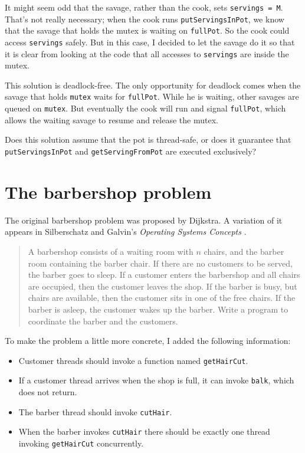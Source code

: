 \documentclass{book}
\newcommand{\clearemptydoublepage}{\newpage\cleardoublepage}
\begin{document}
It might seem odd that the savage, rather than the cook, sets
{\tt servings = M}.  That's not really necessary; when the cook
runs {\tt putServingsInPot}, we know that the savage that holds
the mutex is waiting on {\tt fullPot}.  So the cook could
access {\tt servings} safely.  But in this case, I decided to
let the savage do it so that it is clear from looking at the
code that all accesses to {\tt servings} are inside the mutex.

This solution is deadlock-free.  The only opportunity for
deadlock comes when the savage that holds {\tt mutex} waits
for {\tt fullPot}.  While he is waiting, other savages are
queued on {\tt mutex}.  But eventually the cook will run and
signal {\tt fullPot}, which allows the waiting savage
to resume and release the mutex.

Does this solution assume that the pot is thread-safe, or does it
guarantee that {\tt putServingsInPot} and {\tt getServingFromPot}
are executed exclusively?


\clearemptydoublepage
\section{The barbershop problem}

The original barbershop problem was proposed by
Dijkstra.  A variation of it appears in 
Silberschatz and Galvin's {\em Operating Systems Concepts}
\cite{silberschatz}.

\begin {quotation}
A barbershop consists of a waiting room with $n$ chairs, and the
barber room containing the barber chair.  If there are no customers to
be served, the barber goes to sleep.  If a customer enters the
barbershop and all chairs are occupied, then the customer leaves the
shop.  If the barber is busy, but chairs are available, then the
customer sits in one of the free chairs.  If the barber is asleep, the
customer wakes up the barber.  Write a program to coordinate the
barber and the customers.
\end{quotation}

To make the problem a little more concrete, I added the
following information:

\begin{itemize}

\item Customer threads should invoke a function named {\tt getHairCut}.

\item If a customer thread arrives when the shop is full, 
it can invoke {\tt balk}, which does not return.

\item The barber thread should invoke {\tt cutHair}.

\item When the barber invokes {\tt cutHair} there should
be exactly one thread invoking {\tt getHairCut} concurrently.

\end{itemize}
\end{document}
